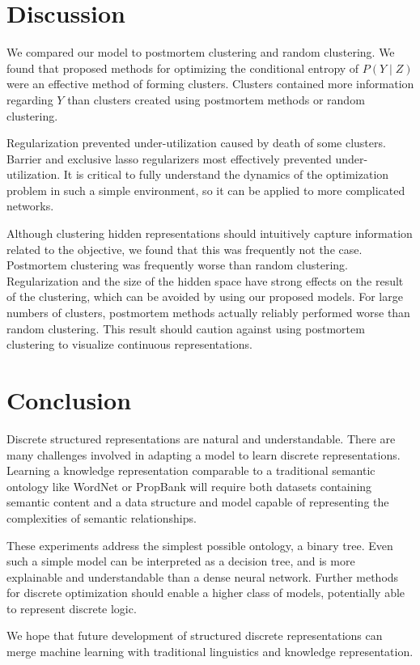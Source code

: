 \documentclass[11pt,letterpaper]{article}
\begin{document}
\section{Discussion}

We compared our model to postmortem clustering and random clustering. We found that proposed methods for optimizing the conditional entropy of $P(Y\mid Z)$ were an effective method of forming clusters. Clusters contained more information regarding $Y$ than clusters created using postmortem methods or random clustering.

Regularization prevented under-utilization caused by death of some clusters. Barrier and exclusive lasso regularizers most effectively prevented under-utilization. It is critical to fully understand the dynamics of the optimization problem in such a simple environment, so it can be applied to more complicated networks.

Although clustering hidden representations should intuitively capture information related to the objective, we found that this was frequently not the case. Postmortem clustering was frequently worse than random clustering. Regularization and the size of the hidden space have strong effects on the result of the clustering, which can be avoided by using our proposed models. For large numbers of clusters, postmortem methods actually reliably performed worse than random clustering. This result should caution against using postmortem clustering to visualize continuous representations.

\section{Conclusion}
Discrete structured representations are natural and understandable. There are many challenges involved in adapting a model to learn discrete representations. Learning a knowledge representation comparable to a traditional semantic ontology like WordNet or PropBank will require both datasets containing semantic content and a data structure and model capable of representing the complexities of semantic relationships.

These experiments address the simplest possible ontology, a binary tree. Even such a simple model can be interpreted as a decision tree, and is more explainable and understandable than a dense neural network. Further methods for discrete optimization should enable a higher class of models, potentially able to represent discrete logic.

We hope that future development of structured discrete representations can merge machine learning with traditional linguistics and knowledge representation.



\end{document}
